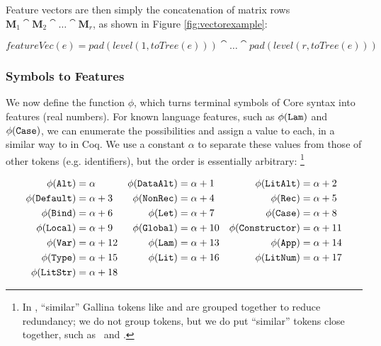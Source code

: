 \begin{sloppypar}
Feature vectors are then simply the concatenation of matrix rows $\mathbf{M}_1 \cat \mathbf{M}_2 \cat \dots \cat \mathbf{M}_r$, as shown in Figure \ref{fig:vectorexample}:
\end{sloppypar}

\begin{equation}
  featureVec(e) = pad(level(1, toTree(e))) \cat \dots \cat pad(level(r, toTree(e)))
\end{equation}

\subsubsection{Symbols to Features}
\label{sec:symbolstofeatures}

We now define the function $\phi$, which turns terminal symbols of Core syntax into features (real numbers). For known language features, such as $\phi(\texttt{Lam})$ and $\phi(\texttt{Case})$, we can enumerate the possibilities and assign a value to each, in a similar way to \cite{DBLP:journals/corr/HerasK14} in Coq. We use a constant $\alpha$ to separate these values from those of other tokens (e.g. identifiers), but the order is essentially arbitrary: \footnote{In \cite{DBLP:journals/corr/HerasK14}, ``similar'' Gallina tokens like  and  are grouped together to reduce redundancy; we do not group tokens, but we do put ``similar'' tokens close together, such as \CLocal\ and \CGlobal.}

\begin{equation} \label{eq:feature}
  \begin{aligned}
    \phi(\texttt{Alt})          &= \alpha      &
    \phi(\texttt{DataAlt})      &= \alpha + 1  &
    \phi(\texttt{LitAlt})       &= \alpha + 2  \\
    \phi(\texttt{Default})      &= \alpha + 3  &
    \phi(\texttt{NonRec})       &= \alpha + 4  &
    \phi(\texttt{Rec})          &= \alpha + 5  \\
    \phi(\texttt{Bind})         &= \alpha + 6  &
    \phi(\texttt{Let})          &= \alpha + 7  &
    \phi(\texttt{Case})         &= \alpha + 8  \\
    \phi(\texttt{Local})        &= \alpha + 9  &
    \phi(\texttt{Global})       &= \alpha + 10 &
    \phi(\texttt{Constructor})  &= \alpha + 11 \\
    \phi(\texttt{Var})          &= \alpha + 12 &
    \phi(\texttt{Lam})          &= \alpha + 13 &
    \phi(\texttt{App})          &= \alpha + 14 \\
    \phi(\texttt{Type})         &= \alpha + 15 &
    \phi(\texttt{Lit})          &= \alpha + 16 &
    \phi(\texttt{LitNum})       &= \alpha + 17 \\
    \phi(\texttt{LitStr})       &= \alpha + 18
  \end{aligned}
\end{equation}

